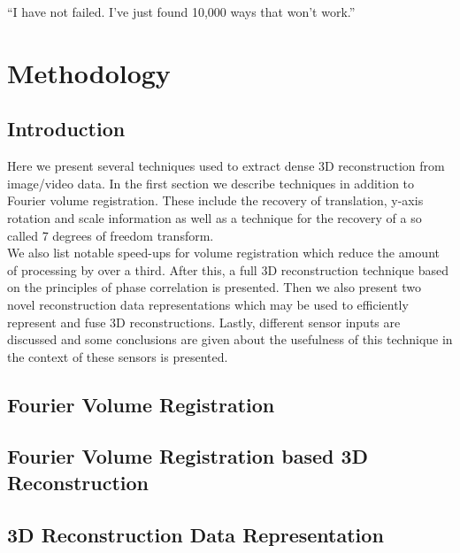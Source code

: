 \begin{savequote}[8cm]
  ``I have not failed. I've just found 10,000 ways that won't work.''
\end{savequote}
\makeatletter
\chapter{Methodology}

\section{Introduction}

Here we present several techniques used to extract dense 3D reconstruction from image/video data. In the first section we describe techniques in addition to Fourier volume registration. These include the recovery of translation, y-axis rotation and scale information as well as a technique for the recovery of a so called 7 degrees of freedom transform. \\

We also list notable speed-ups for volume registration which reduce the amount of processing by over a third. After this, a full 3D reconstruction technique based on the principles of phase correlation is presented. Then we also present two novel reconstruction data representations which may be used to efficiently represent and fuse 3D reconstructions. Lastly, different sensor inputs are discussed and some conclusions are given about the usefulness of this technique in the context of these sensors is presented.

\section{Fourier Volume Registration} 





\section{Fourier Volume Registration based 3D Reconstruction}



\section{3D Reconstruction Data Representation}

